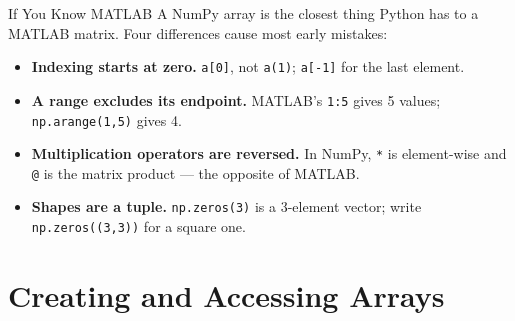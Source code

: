 \documentclass[9pt,aspectratio=169,xcolor=table]{beamer}
\begin{document}
\begin{frame}{If You Know MATLAB}
    \leavevmode
    \small
    A NumPy array is the closest thing Python has to a MATLAB matrix.
    Four differences cause most early mistakes:

    \vspace{2mm}
    \begin{itemize}
        \item \textbf{Indexing starts at zero.} \texttt{a[0]}, not
              \texttt{a(1)}; \texttt{a[-1]} for the last element.
        \item \textbf{A range excludes its endpoint.} MATLAB's
              \texttt{1:5} gives 5 values; \texttt{np.arange(1,5)}
              gives 4.
        \item \textbf{Multiplication operators are reversed.} In NumPy,
              \texttt{*} is element-wise and \texttt{@} is the matrix
              product --- the \alert{opposite} of MATLAB.
        \item \textbf{Shapes are a tuple.} \texttt{np.zeros(3)} is a
              3-element vector; write \texttt{np.zeros((3,3))} for a
              square one.
    \end{itemize}
\end{frame}

\section{Creating and Accessing Arrays}
\end{document}
